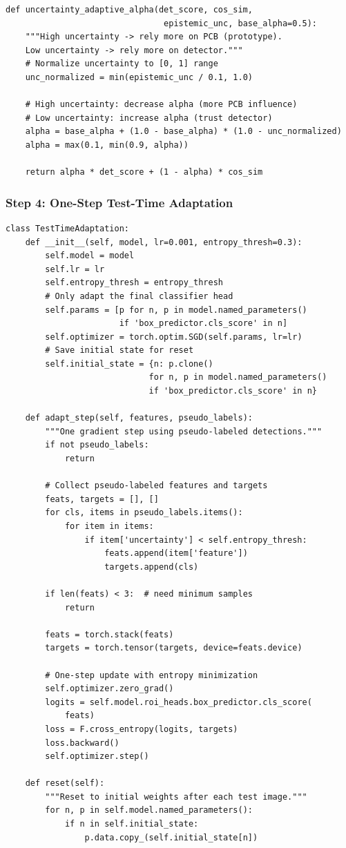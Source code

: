 \documentclass[11pt,a4paper]{article}
\begin{document}
\begin{lstlisting}[caption={Adaptive alpha based on prediction uncertainty}]
def uncertainty_adaptive_alpha(det_score, cos_sim,
                                epistemic_unc, base_alpha=0.5):
    """High uncertainty -> rely more on PCB (prototype).
    Low uncertainty -> rely more on detector."""
    # Normalize uncertainty to [0, 1] range
    unc_normalized = min(epistemic_unc / 0.1, 1.0)

    # High uncertainty: decrease alpha (more PCB influence)
    # Low uncertainty: increase alpha (trust detector)
    alpha = base_alpha + (1.0 - base_alpha) * (1.0 - unc_normalized)
    alpha = max(0.1, min(0.9, alpha))

    return alpha * det_score + (1 - alpha) * cos_sim
\end{lstlisting}

\subsubsection{Step 4: One-Step Test-Time Adaptation}

\begin{lstlisting}[caption={Test-time adaptation of classifier head}]
class TestTimeAdaptation:
    def __init__(self, model, lr=0.001, entropy_thresh=0.3):
        self.model = model
        self.lr = lr
        self.entropy_thresh = entropy_thresh
        # Only adapt the final classifier head
        self.params = [p for n, p in model.named_parameters()
                       if 'box_predictor.cls_score' in n]
        self.optimizer = torch.optim.SGD(self.params, lr=lr)
        # Save initial state for reset
        self.initial_state = {n: p.clone()
                             for n, p in model.named_parameters()
                             if 'box_predictor.cls_score' in n}

    def adapt_step(self, features, pseudo_labels):
        """One gradient step using pseudo-labeled detections."""
        if not pseudo_labels:
            return

        # Collect pseudo-labeled features and targets
        feats, targets = [], []
        for cls, items in pseudo_labels.items():
            for item in items:
                if item['uncertainty'] < self.entropy_thresh:
                    feats.append(item['feature'])
                    targets.append(cls)

        if len(feats) < 3:  # need minimum samples
            return

        feats = torch.stack(feats)
        targets = torch.tensor(targets, device=feats.device)

        # One-step update with entropy minimization
        self.optimizer.zero_grad()
        logits = self.model.roi_heads.box_predictor.cls_score(
            feats)
        loss = F.cross_entropy(logits, targets)
        loss.backward()
        self.optimizer.step()

    def reset(self):
        """Reset to initial weights after each test image."""
        for n, p in self.model.named_parameters():
            if n in self.initial_state:
                p.data.copy_(self.initial_state[n])
\end{lstlisting}
\end{document}
